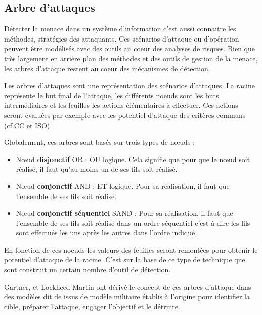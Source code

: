 \subsection{Arbre d'attaques} \label{ref_arbre_attaques}


Détecter la menace dans un système d'information c'est aussi connaitre les méthodes, stratégies des attaquants. Ces scénarios d'attaque ou d'opération peuvent être modélisés avec des outils au coeur des analyses de risques. Bien que très largement en arrière plan des méthodes et des outils de gestion de la menace, les arbres d'attaque restent au coeur des mécanismes de détection.

Les arbres d'attaques sont une représentation des scénarios d'attaques. La racine représente le but final de l'attaque, les différents noeuds sont les buts intermédiaires et les feuilles les actions élémentaires à effectuer. Ces actions seront évaluées par exemple avec les potentiel d'attaque des critères communs (cf.CC et ISO)

Globalement, ces arbres sont basés sur trois types de nœuds :

\begin{itemize}
  \item Nœud \textbf{disjonctif} OR : OU logique. Cela signifie que pour que le nœud soit réalisé, il faut qu’au moins un de ses fils soit réalisé.
  \item Nœud \textbf{conjonctif} AND : ET logique. Pour sa réalisation, il faut que l’ensemble de ses fils soit réalisé.
  \item Nœud \textbf{conjonctif séquentiel }SAND : Pour sa réalisation, il faut que l'ensemble de ses fils soit réalisé dans un ordre séquentiel c'est-à-dire les fils sont effectués les uns après les autres dans l’ordre indiqué.
\end{itemize}

En fonction de ces noeuds les valeurs des feuilles seront remontées pour obtenir le potentiel d'attaque de la racine.
C'est sur la base de ce type de technique que sont construit un certain nombre d'outil de détection.
 

Gartner, et Lockheed Martin ont dérivé le concept de ces arbres d'attaque dans des modèles dit de  issus de modèle militaire établis à l’origine pour identifier la cible, préparer l’attaque, engager l’objectif et le détruire.

